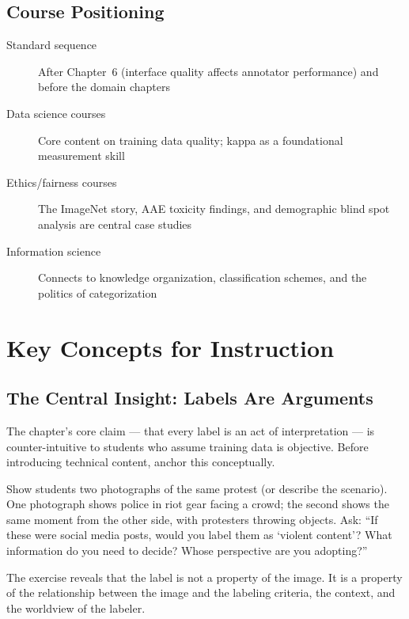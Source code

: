 \subsection{Course Positioning}

\begin{description}
    \item[Standard sequence] After Chapter~6 (interface quality affects annotator performance) and before the domain chapters
    \item[Data science courses] Core content on training data quality; kappa as a foundational measurement skill
    \item[Ethics/fairness courses] The ImageNet story, AAE toxicity findings, and demographic blind spot analysis are central case studies
    \item[Information science] Connects to knowledge organization, classification schemes, and the politics of categorization
\end{description}

\section{Key Concepts for Instruction}

\subsection{The Central Insight: Labels Are Arguments}

The chapter's core claim --- that every label is an act of interpretation --- is counter-intuitive to students who assume training data is objective. Before introducing technical content, anchor this conceptually.

\begin{technote}
Show students two photographs of the same protest (or describe the scenario). One photograph shows police in riot gear facing a crowd; the second shows the same moment from the other side, with protesters throwing objects. Ask: ``If these were social media posts, would you label them as `violent content'? What information do you need to decide? Whose perspective are you adopting?''

The exercise reveals that the label is not a property of the image. It is a property of the relationship between the image and the labeling criteria, the context, and the worldview of the labeler.
\end{technote}

